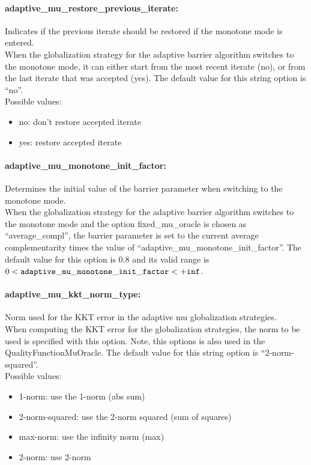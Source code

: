 \paragraph{adaptive\_mu\_restore\_previous\_iterate:} Indicates if the previous iterate should be restored if the monotone mode is entered. $\;$ \\
 When the globalization strategy for the adaptive
barrier algorithm switches to the monotone mode,
it can either start from the most recent iterate
(no), or from the last iterate that was accepted
(yes).
The default value for this string option is ``no''.
\\ 
Possible values:
\begin{itemize}
   \item no: don't restore accepted iterate
   \item yes: restore accepted iterate
\end{itemize}

\paragraph{adaptive\_mu\_monotone\_init\_factor:} Determines the initial value of the barrier parameter when switching to the monotone mode. $\;$ \\
 When the globalization strategy for the adaptive
barrier algorithm switches to the monotone mode
and the option fixed\_mu\_oracle is chosen as
``average\_compl'', the barrier parameter is set to
the current average complementarity times the
value of ``adaptive\_mu\_monotone\_init\_factor''. The default value for this option is $0.8$ and its valid range is $0 <  {\tt adaptive\_mu\_monotone\_init\_factor } <  {\tt +inf}$.


\paragraph{adaptive\_mu\_kkt\_norm\_type:} Norm used for the KKT error in the adaptive mu globalization strategies. $\;$ \\
 When computing the KKT error for the
globalization strategies, the norm to be used is
specified with this option. Note, this options is
also used in the QualityFunctionMuOracle.
The default value for this string option is ``2-norm-squared''.
\\ 
Possible values:
\begin{itemize}
   \item 1-norm: use the 1-norm (abs sum)
   \item 2-norm-squared: use the 2-norm squared (sum of squares)
   \item max-norm: use the infinity norm (max)
   \item 2-norm: use 2-norm
\end{itemize}

